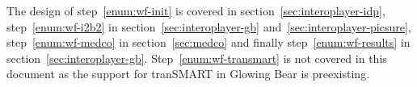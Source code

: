 The design of step~\ref{enum:wf-init} is covered in section~\ref{sec:interoplayer-idp}, 
step~\ref{enum:wf-i2b2} in section~\ref{sec:interoplayer-gb} and~\ref{sec:interoplayer-picsure}, 
step~\ref{enum:wf-medco} in section~\ref{sec:medco} and finally 
step~\ref{enum:wf-results} in section~\ref{sec:interoplayer-gb}.
Step~\ref{enum:wf-transmart} is not covered in this document as the support for tranSMART in Glowing Bear is preexisting.


